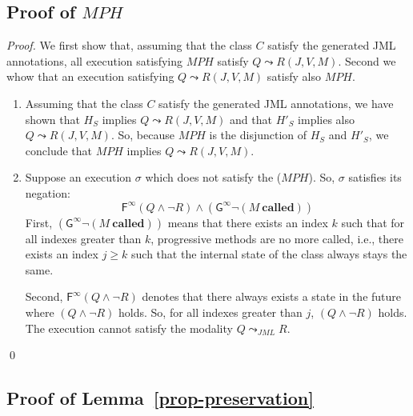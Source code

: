 \subsection{Proof of $MPH$}
\label{sec-proof-proposition-MPHminimal}

\begin{proof}
We first show that, assuming that the class $C$ 
satisfy the generated JML annotations, all execution satisfying $MPH$ 
satisfy $Q \leadsto R (J,V,M)$. Second we whow that an execution 
satisfying $Q \leadsto R (J,V,M)$ satisfy also $MPH$.
\begin{enumerate}
\item  Assuming that the class $C$ 
satisfy the generated JML annotations, we have shown that $H_S$ 
implies  $Q \leadsto R (J,V,M)$ and that  $H'_S$ implies 
also  $Q \leadsto R (J,V,M)$. So, because $MPH$ is the 
disjunction of $H_S$ and $H'_S$, we conclude that $MPH$
implies $Q \leadsto R (J,V,M)$.
\item Suppose an execution $\sigma$ which 
does not satisfy the ($MPH$). So, $\sigma$ satisfies
its negation:
$$ \mathsf{F^{\infty}}  (Q \wedge \neg R) \wedge (\mathsf{G^{\infty}} \neg (M ~ \mathbf{called}))$$
First, $(\mathsf{G^{\infty}} \neg (M ~ \mathbf{called}))$ means that
there exists an index $k$ such that for all indexes greater than $k$, 
progressive
methods are no more called, i.e., there exists an index $j \geq k$
such that the internal state of the class always stays the same. 

Second, $ \mathsf{F^{\infty}}  (Q \wedge \neg R)$ denotes that there always
exists a state in the future where $(Q \wedge \neg R)$ holds. So, for
all indexes greater than $j$, $(Q \wedge \neg R)$ holds. 
The execution cannot satisfy the modality $Q \leadsto_{JML} R$.
\end{enumerate}
\qed
\end{proof}

\subsection{Proof of Lemma~\ref{prop-preservation}}
\label{sec-proof-proposition-preservation}

